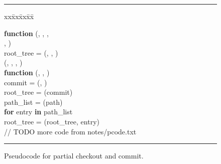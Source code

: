 \begin{figure}[htb]
\small
\rule{\linewidth}{.08em}

\begin{tabbing}
xx\=xx\=xx\=xx\=\kill

{\bf function} (, ,
, \\
\>\>\> , ) \\
\> root\_tree = (, ,
) \\
\> (, ,
, ) \\ [2mm]

{\bf function}  (, , ) \\
\> commit = (, ) \\
\> root\_tree = (commit) \\
\> path\_list = (path) \\ %
\> {\bf for} entry {\bf in} path\_list \\
\>\> root\_tree = (root\_tree, entry) \\ [2mm]

// TODO more code from notes/pcode.txt

\end{tabbing}

\rule{\linewidth}{.08em}
\caption{Pseudocode for partial checkout and commit.}
\label{f:pcode-checkout}
\end{figure}

\endinput

\begin{algorithmic}
    \Function{checkout}{$\mathit{commit\_id}, \mathit{relative\_root\_path},
        \mathit{destination\_path}, \mathit{access\_control\_list}, \mathit{repo}$}
    \EndFunction
\end{algorithmic}

